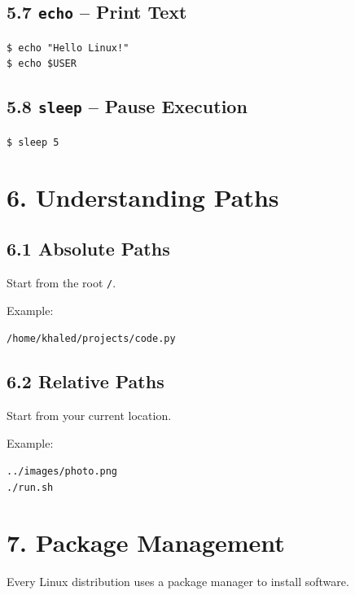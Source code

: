 \documentclass[12pt]{article}
\begin{document}
\subsection*{5.7 \texttt{echo} – Print Text}

\begin{highlightbox}
\texttt{\$ echo "Hello Linux!"}\\
\texttt{\$ echo \$USER}
\end{highlightbox}

\subsection*{5.8 \texttt{sleep} – Pause Execution}

\begin{highlightbox}
\texttt{\$ sleep 5}
\end{highlightbox}

\section*{6. Understanding Paths}

\subsection*{6.1 Absolute Paths}

Start from the root \texttt{/}.

Example:

\begin{highlightbox}
\texttt{/home/khaled/projects/code.py}
\end{highlightbox}

\subsection*{6.2 Relative Paths}

Start from your current location.

Example:

\begin{highlightbox}
\texttt{../images/photo.png}\\
\texttt{./run.sh}
\end{highlightbox}

\section*{7. Package Management}

Every Linux distribution uses a package manager to install software.
\end{document}
